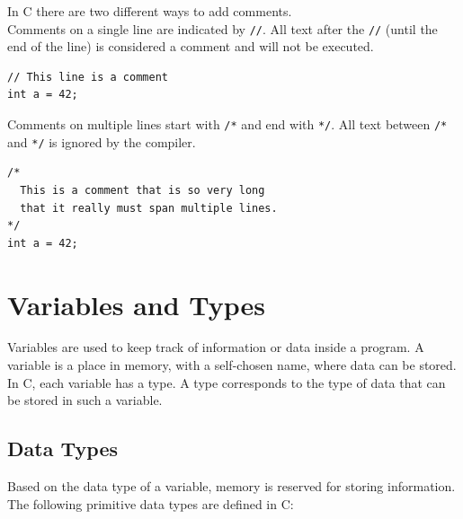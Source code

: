 \documentclass[11pt,fleqn]{book} %
\def\Cpp{{C\nolinebreak[4]\hspace{-.05em}\raisebox{.4ex}{\tiny\bf ++}}}
\begin{document}
\noindent In \Cpp{} there are two different ways to add comments.\\ Comments on a single line are indicated by \texttt{//}. All text after the \texttt{//} (until the end of the line) is considered a comment and will not be executed.

\begin{example}[A Comment]
	\phantom{ }
	\begin{verbatim}
// This line is a comment
int a = 42;
	\end{verbatim}
\end{example}

\noindent Comments on multiple lines start with \texttt{/*} and end with \texttt{*/}. All text between \texttt{/*} and \texttt{*/} is ignored by the compiler.

\begin{example}
	\phantom{ }
	\begin{verbatim}
/*
  This is a comment that is so very long
  that it really must span multiple lines.
*/
int a = 42;
	\end{verbatim}
\end{example}

\chapter{Variables and Types}
Variables are used to keep track of information or data inside a program. A variable is a place in memory, with a self-chosen name, where data can be stored. In \Cpp{}, each variable has a type. A type corresponds to the type of data that can be stored in such a variable.

\section{Data Types}
\label{section:datatypes}

Based on the data type of a variable, memory is reserved for storing information. The following primitive data types are defined in \Cpp{}:\\
\end{document}
